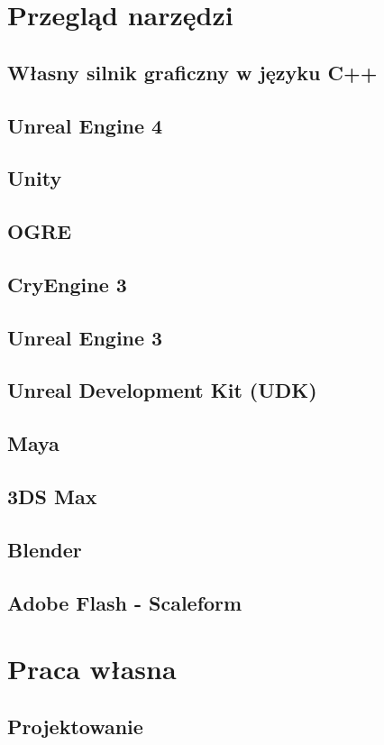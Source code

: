 \documentclass[10pt,a4paper,onecolumn]{article}
\begin{document}
\section{Przegląd narzędzi}
\subsection{Własny silnik graficzny w języku C++}
\subsection{Unreal Engine 4}
\subsection{Unity}
\subsection{OGRE}
\subsection{CryEngine 3}
\subsection{Unreal Engine 3}
\subsection{Unreal Development Kit (UDK)}
\subsection{Maya}
\subsection{3DS Max}
\subsection{Blender}
\subsection{Adobe Flash - Scaleform}

\section{Praca własna}
\subsection{Projektowanie}
\end{document}
